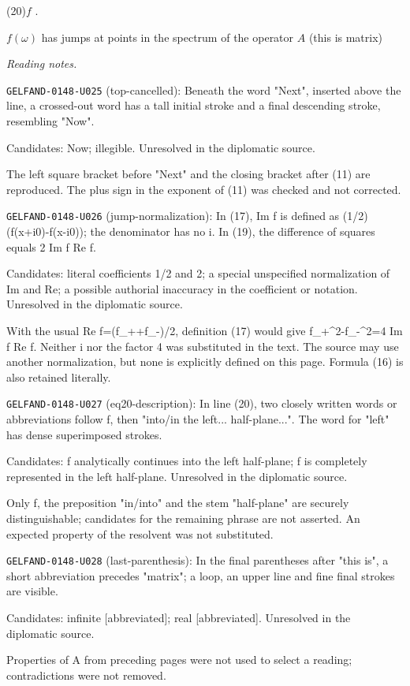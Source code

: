(20)\quad $f$
.

$f(\omega)$ has jumps at points in the spectrum of the operator $A$
(this is  matrix)


\par\smallskip\noindent\textit{Reading notes.}\par
\noindent\texttt{GELFAND-0148-U025} (top-cancelled): Beneath the word "Next", inserted above the line, a crossed-out word has a tall initial stroke and a final descending stroke, resembling "Now".\par
Candidates: Now; illegible. Unresolved in the diplomatic source.\par
The left square bracket before "Next" and the closing bracket after (11) are reproduced. The plus sign in the exponent of (11) was checked and not corrected.\par
\noindent\texttt{GELFAND-0148-U026} (jump-normalization): In (17), Im f is defined as (1/2)(f(x+i0)-f(x-i0)); the denominator has no i. In (19), the difference of squares equals 2 Im f Re f.\par
Candidates: literal coefficients 1/2 and 2; a special unspecified normalization of Im and Re; a possible authorial inaccuracy in the coefficient or notation. Unresolved in the diplomatic source.\par
With the usual Re f=(f\_++f\_-)/2, definition (17) would give f\_+\textasciicircum{}2-f\_-\textasciicircum{}2=4 Im f Re f. Neither i nor the factor 4 was substituted in the text. The source may use another normalization, but none is explicitly defined on this page. Formula (16) is also retained literally.\par
\noindent\texttt{GELFAND-0148-U027} (eq20-description): In line (20), two closely written words or abbreviations follow f, then "into/in the left... half-plane...". The word for "left" has dense superimposed strokes.\par
Candidates: f analytically continues into the left half-plane; f is completely represented in the left half-plane. Unresolved in the diplomatic source.\par
Only f, the preposition "in/into" and the stem "half-plane" are securely distinguishable; candidates for the remaining phrase are not asserted. An expected property of the resolvent was not substituted.\par
\noindent\texttt{GELFAND-0148-U028} (last-parenthesis): In the final parentheses after "this is", a short abbreviation precedes "matrix"; a loop, an upper line and fine final strokes are visible.\par
Candidates: infinite [abbreviated]; real [abbreviated]. Unresolved in the diplomatic source.\par
Properties of A from preceding pages were not used to select a reading; contradictions were not removed.\par


